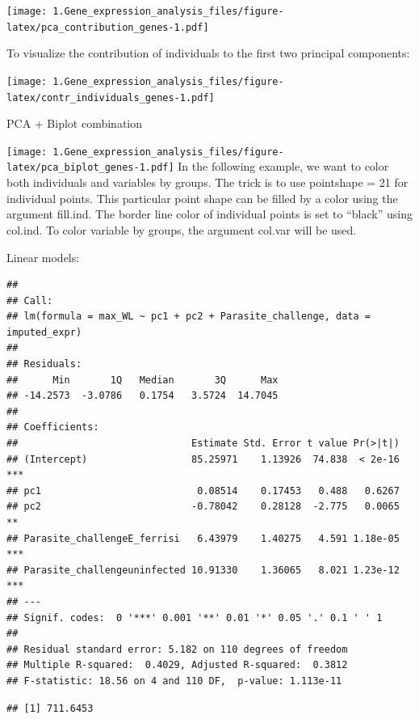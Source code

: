 \documentclass[
]{article}
\begin{document}
\texttt{[image: 1.Gene\_expression\_analysis\_files/figure-latex/pca\_contribution\_genes-1.pdf]}

To visualize the contribution of individuals to the first two principal
components:

\texttt{[image: 1.Gene\_expression\_analysis\_files/figure-latex/contr\_individuals\_genes-1.pdf]}

PCA + Biplot combination

\texttt{[image: 1.Gene\_expression\_analysis\_files/figure-latex/pca\_biplot\_genes-1.pdf]}
In the following example, we want to color both individuals and
variables by groups. The trick is to use pointshape = 21 for individual
points. This particular point shape can be filled by a color using the
argument fill.ind. The border line color of individual points is set to
``black'' using col.ind. To color variable by groups, the argument
col.var will be used.

Linear models:

\begin{verbatim}
## 
## Call:
## lm(formula = max_WL ~ pc1 + pc2 + Parasite_challenge, data = imputed_expr)
## 
## Residuals:
##      Min       1Q   Median       3Q      Max 
## -14.2573  -3.0786   0.1754   3.5724  14.7045 
## 
## Coefficients:
##                              Estimate Std. Error t value Pr(>|t|)    
## (Intercept)                  85.25971    1.13926  74.838  < 2e-16 ***
## pc1                           0.08514    0.17453   0.488   0.6267    
## pc2                          -0.78042    0.28128  -2.775   0.0065 ** 
## Parasite_challengeE_ferrisi   6.43979    1.40275   4.591 1.18e-05 ***
## Parasite_challengeuninfected 10.91330    1.36065   8.021 1.23e-12 ***
## ---
## Signif. codes:  0 '***' 0.001 '**' 0.01 '*' 0.05 '.' 0.1 ' ' 1
## 
## Residual standard error: 5.182 on 110 degrees of freedom
## Multiple R-squared:  0.4029, Adjusted R-squared:  0.3812 
## F-statistic: 18.56 on 4 and 110 DF,  p-value: 1.113e-11
\end{verbatim}

\begin{verbatim}
## [1] 711.6453
\end{verbatim}
\end{document}
